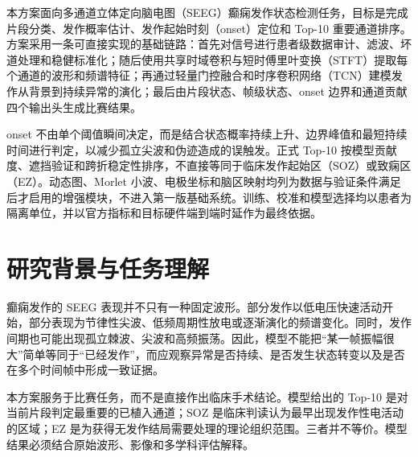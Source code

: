 \documentclass{cumcmthesis_v3}
\numberwithin{figure}{section}
\numberwithin{table}{section}
\begin{document}
\normalem
\maketitle

\newpage
\thispagestyle{empty}
\tableofcontents
\newpage

\thispagestyle{empty}
\listoffigures
\newpage

\thispagestyle{empty}
\listoftables
\newpage

\setcounter{page}{1}

\begin{cnabstract}
本方案面向多通道立体定向脑电图（SEEG）癫痫发作状态检测任务，目标是完成片段分类、发作概率估计、发作起始时刻（onset）定位和 Top-10 重要通道排序。方案采用一条可直接实现的基础链路：首先对信号进行患者级数据审计、滤波、坏道处理和稳健标准化；随后使用共享时域卷积与短时傅里叶变换（STFT）提取每个通道的波形和频谱特征；再通过轻量门控融合和时序卷积网络（TCN）建模发作从背景到持续异常的演化；最后由片段状态、帧级状态、onset 边界和通道贡献四个输出头生成比赛结果。

onset 不由单个阈值瞬间决定，而是结合状态概率持续上升、边界峰值和最短持续时间进行判定，以减少孤立尖波和伪迹造成的误触发。正式 Top-10 按模型贡献度、遮挡验证和跨折稳定性排序，不直接等同于临床发作起始区（SOZ）或致痫区（EZ）。动态图、Morlet 小波、电极坐标和脑区映射均列为数据与验证条件满足后才启用的增强模块，不进入第一版基础系统。训练、校准和模型选择均以患者为隔离单位，并以官方指标和目标硬件端到端时延作为最终依据。

\end{cnabstract}

\section*{研究背景与任务理解}

癫痫发作的 SEEG 表现并不只有一种固定波形。部分发作以低电压快速活动开始，部分表现为节律性尖波、低频周期性放电或逐渐演化的频谱变化\cite{abdallah_sop}。同时，发作间期也可能出现孤立棘波、尖波和高频振荡。因此，模型不能把“某一帧振幅很大”简单等同于“已经发作”，而应观察异常是否持续、是否发生状态转变以及是否在多个时间帧中形成一致证据。

本方案服务于比赛任务，而不是直接作出临床手术结论。模型给出的 Top-10 是对当前片段判定最重要的已植入通道；SOZ 是临床判读认为最早出现发作性电活动的区域；EZ 是为获得无发作结局需要处理的理论组织范围。三者并不等价\cite{rosenow_ez}。模型结果必须结合原始波形、影像和多学科评估解释。
\end{document}

